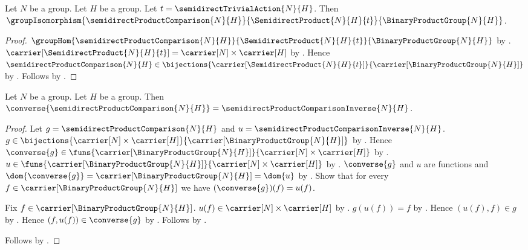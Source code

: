 \begin{theorem}\label{semidirect_product_comparison_isomorphism}
    Let $N$ be a group.
    Let $H$ be a group.
    Let $t=\semidirectTrivialAction{N}{H}$.
    Then
        $\groupIsomorphism{\semidirectProductComparison{N}{H}}
            {\SemidirectProduct{N}{H}{t}}{\BinaryProductGroup{N}{H}}$.
\end{theorem}
\begin{proof}
    $\groupHom{\semidirectProductComparison{N}{H}}
        {\SemidirectProduct{N}{H}{t}}{\BinaryProductGroup{N}{H}}$ by
        .
    $\carrier[\SemidirectProduct{N}{H}{t}]=
        \carrier[N]\times\carrier[H]$ by
        .
    Hence $\semidirectProductComparison{N}{H}\in
        \bijections{\carrier[\SemidirectProduct{N}{H}{t}]}
            {\carrier[\BinaryProductGroup{N}{H}]}$ by
        .
    Follows by .
\end{proof}

\begin{proposition}\label{semidirect_product_comparison_converse}
    Let $N$ be a group.
    Let $H$ be a group.
    Then
        $\converse{\semidirectProductComparison{N}{H}}=
            \semidirectProductComparisonInverse{N}{H}$.
\end{proposition}
\begin{proof}
    Let $g=\semidirectProductComparison{N}{H}$ and
        $u=\semidirectProductComparisonInverse{N}{H}$.
    $g\in\bijections{\carrier[N]\times\carrier[H]}
        {\carrier[\BinaryProductGroup{N}{H}]}$ by
        .
    Hence $\converse{g}\in\funs{\carrier[\BinaryProductGroup{N}{H}]}
        {\carrier[N]\times\carrier[H]}$ by
        .
    $u\in\funs{\carrier[\BinaryProductGroup{N}{H}]}
        {\carrier[N]\times\carrier[H]}$ by
        .
    $\converse{g}$ and $u$ are functions and
        $\dom{\converse{g}}=\carrier[\BinaryProductGroup{N}{H}]
            =\dom{u}$ by
        .
    Show that for every $f\in\carrier[\BinaryProductGroup{N}{H}]$ we have
        $(\converse{g})(f)=u(f)$.
    \begin{subproof}
        Fix $f\in\carrier[\BinaryProductGroup{N}{H}]$.
        $u(f)\in\carrier[N]\times\carrier[H]$ by
            .
        $g(u(f))=f$ by
            .
        Hence $(u(f),f)\in g$ by
            .
        Hence $(f,u(f))\in\converse{g}$ by .
        Follows by .
    \end{subproof}
    Follows by .
\end{proof}


